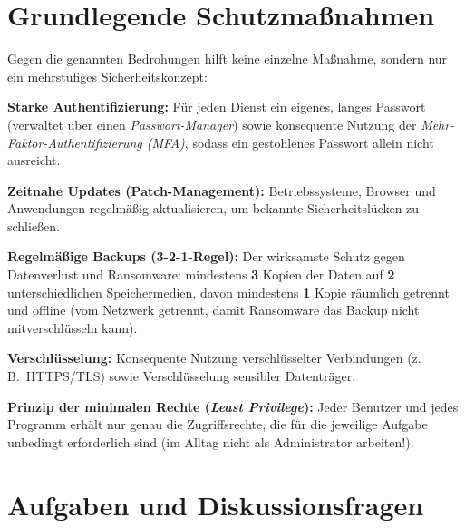 \section{Grundlegende Schutzmaßnahmen}

Gegen die genannten Bedrohungen hilft keine einzelne Maßnahme, sondern nur ein
mehrstufiges Sicherheitskonzept:

\begin{compactitem}
\item \textbf{Starke Authentifizierung:} Für jeden Dienst ein eigenes, langes
Passwort (verwaltet über einen \emph{Passwort-Manager}) sowie konsequente
Nutzung der \emph{Mehr-Faktor-Authentifizierung (MFA)}, sodass ein gestohlenes
Passwort allein nicht ausreicht.
\item \textbf{Zeitnahe Updates (Patch-Management):} Betriebssysteme, Browser
und Anwendungen regelmäßig aktualisieren, um bekannte Sicherheitslücken zu
schließen.
\item \textbf{Regelmäßige Backups (3-2-1-Regel):} Der wirksamste Schutz gegen
Datenverlust und Ransomware: mindestens \textbf{3} Kopien der Daten auf
\textbf{2} unterschiedlichen Speichermedien, davon mindestens \textbf{1} Kopie
räumlich getrennt und offline (vom Netzwerk getrennt, damit Ransomware das
Backup nicht mitverschlüsseln kann).
\item \textbf{Verschlüsselung:} Konsequente Nutzung verschlüsselter
Verbindungen (z.\,B.\ HTTPS/TLS) sowie Verschlüsselung sensibler Datenträger.
\item \textbf{Prinzip der minimalen Rechte (\emph{Least Privilege}):} Jeder
Benutzer und jedes Programm erhält nur genau die Zugriffsrechte, die für die
jeweilige Aufgabe unbedingt erforderlich sind (im Alltag nicht als
Administrator arbeiten!).
\end{compactitem}


\section{Aufgaben und Diskussionsfragen}

